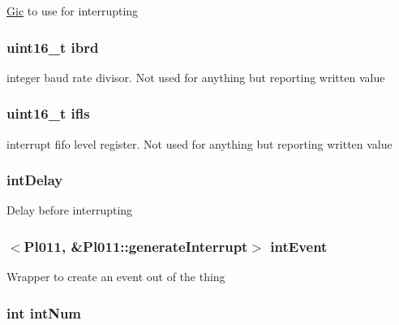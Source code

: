 \label{classPl011_a2e2266dca56928f63667e994933169ee}
\hyperlink{namespaceGic}{Gic} to use for interrupting \hypertarget{classPl011_a2be86c72c0a31f12141cb12224bc04b8}{
\subsubsection[{ibrd}]{\setlength{\rightskip}{0pt plus 5cm}uint16\_\-t {\bf ibrd}}}
\label{classPl011_a2be86c72c0a31f12141cb12224bc04b8}
integer baud rate divisor. Not used for anything but reporting written value \hypertarget{classPl011_a832059b95a1d4d0dc403ccf467926370}{
\subsubsection[{ifls}]{\setlength{\rightskip}{0pt plus 5cm}uint16\_\-t {\bf ifls}}}
\label{classPl011_a832059b95a1d4d0dc403ccf467926370}
interrupt fifo level register. Not used for anything but reporting written value \hypertarget{classPl011_a0dad0b6dbada03eb5daf9c1ed859d62e}{
\subsubsection[{intDelay}]{ {\bf intDelay}}}
\label{classPl011_a0dad0b6dbada03eb5daf9c1ed859d62e}
Delay before interrupting \hypertarget{classPl011_a2d115d060cc035b8f10239e7bcc104f0}{
\subsubsection[{intEvent}]{$<${\bf Pl011}, \&Pl011::generateInterrupt$>$ {\bf intEvent}}}
\label{classPl011_a2d115d060cc035b8f10239e7bcc104f0}
Wrapper to create an event out of the thing \hypertarget{classPl011_a9bd4d49b818d8cf1a6dee0576d2ff039}{
\subsubsection[{intNum}]{\setlength{\rightskip}{0pt plus 5cm}int {\bf intNum}}}
